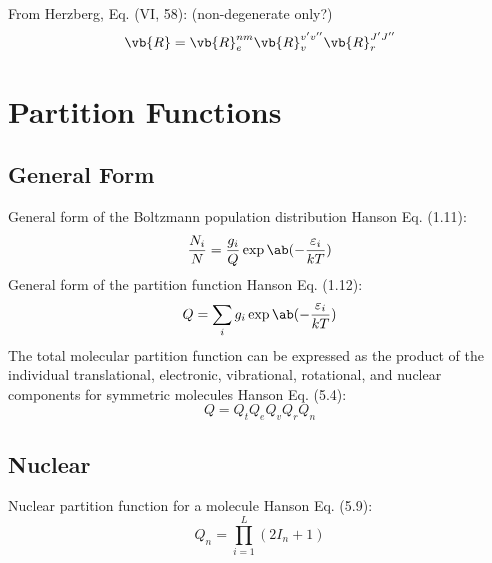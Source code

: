 \documentclass[11pt, twoside, fleqn]{report}
\begin{document}
From Herzberg, Eq. (VI, 58): (non-degenerate only?)
\begin{equation*}
    \vb{R} = \vb{R}_{e}^{nm}\vb{R}_{v}^{v'v''}\vb{R}_{r}^{J'J''}
\end{equation*}

\section{Partition Functions}

\subsection{General Form}

General form of the Boltzmann population distribution Hanson Eq. (1.11):
\begin{equation*}
    \frac{N_{i}}{N} = \frac{g_{i}}{Q}\exp\ab(-\frac{\varepsilon_{i}}{kT})
\end{equation*}
General form of the partition function Hanson Eq. (1.12):
\begin{equation*}
    Q = \sum_{i} g_{i}\exp\ab(-\frac{\varepsilon_{i}}{kT})
\end{equation*}
The total molecular partition function can be expressed as the product of the individual translational, electronic, vibrational, rotational, and nuclear components for symmetric molecules Hanson Eq. (5.4):
\begin{equation*}
    Q = Q_{t}Q_{e}Q_{v}Q_{r}Q_{n}
\end{equation*}

\subsection{Nuclear}

Nuclear partition function for a molecule Hanson Eq. (5.9):
\begin{equation*}
    Q_{n} = \prod_{i = 1}^{L} (2I_{n} + 1)
\end{equation*}
\end{document}
